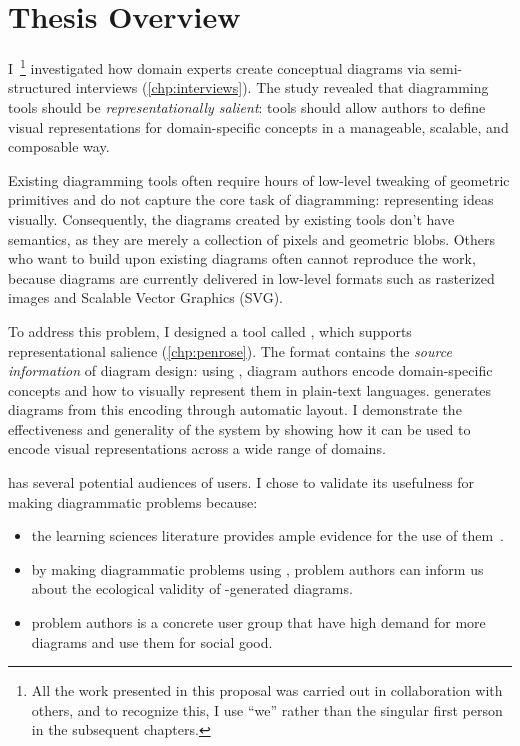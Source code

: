 \section{Thesis Overview}

I~\footnote{All the work presented in this proposal was carried out in collaboration with others, and to recognize this, I use ``we'' rather than the singular first person in the subsequent chapters.} investigated how domain experts create conceptual diagrams via semi-structured interviews (\cref{chp:interviews}). The study revealed that diagramming tools should be \textit{representationally salient}: tools should allow authors to define visual representations for domain-specific concepts in a manageable, scalable, and composable way. 

Existing diagramming tools often require hours of low-level tweaking of geometric primitives and do not capture the core task of diagramming: representing ideas visually. Consequently, the diagrams created by existing tools don't have semantics, as they are merely a collection of pixels and geometric blobs. Others who want to build upon existing diagrams often cannot reproduce the work, because diagrams are currently delivered in low-level formats such as rasterized images and Scalable Vector Graphics (SVG). 

To address this problem, I designed a tool called \Penrose, which supports representational salience (\cref{chp:penrose}). The \Penrose format contains the \emph{source information} of diagram design: using \Penrose, diagram authors encode domain-specific concepts and how to visually represent them in plain-text languages. \Penrose generates diagrams from this encoding through automatic layout. I demonstrate the effectiveness and generality of the system by showing how it can be used to encode visual representations across a wide range of domains.

\Penrose has several potential audiences of users. I chose to validate its usefulness for making diagrammatic problems because:

\begin{itemize}
    \item the learning sciences literature provides ample evidence for the use of them~\cite{multipleReps, multimediaLearning, cotraining}.
    \item by making diagrammatic problems using \Penrose, problem authors can inform us about the ecological validity of \Penrose-generated diagrams.
    \item problem authors is a concrete user group that have high demand for more diagrams and use them for social good.
\end{itemize}

